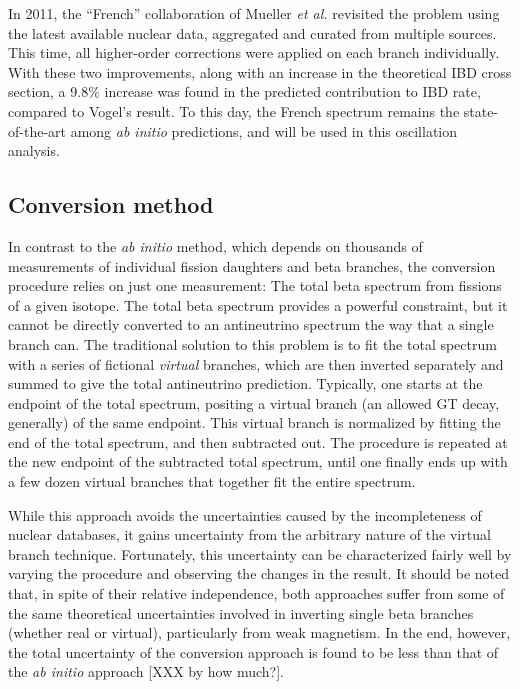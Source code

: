 \documentclass[../thesis.tex]{subfiles}
\begin{document}
In 2011, the ``French'' collaboration of Mueller \emph{et al.} revisited the problem using the latest available nuclear data, aggregated and curated from multiple sources. This time, all higher-order corrections were applied on each branch individually. With these two improvements, along with an increase in the theoretical IBD cross section, a 9.8\% increase was found in the predicted \ureight contribution to IBD rate, compared to Vogel's result. To this day, the French spectrum remains the state-of-the-art among \ureight \emph{ab initio} predictions, and will be used in this oscillation analysis.

\subsection{Conversion method}
\label{sec:conversion}

In contrast to the \emph{ab initio} method, which depends on thousands of measurements of individual fission daughters and beta branches, the conversion procedure relies on just one measurement: The total beta spectrum from fissions of a given isotope. The total beta spectrum provides a powerful constraint, but it cannot be directly converted to an antineutrino spectrum the way that a single branch can. The traditional solution to this problem is to fit the total spectrum with a series of fictional \emph{virtual} branches, which are then inverted separately and summed to give the total antineutrino prediction. Typically, one starts at the endpoint of the total spectrum, positing a virtual branch (an allowed GT decay, generally) of the same endpoint. This virtual branch is normalized by fitting the end of the total spectrum, and then subtracted out. The procedure is repeated at the new endpoint of the subtracted total spectrum, until one finally ends up with a few dozen virtual branches that together fit the entire spectrum.

While this approach avoids the uncertainties caused by the incompleteness of nuclear databases, it gains uncertainty from the arbitrary nature of the virtual branch technique. Fortunately, this uncertainty can be characterized fairly well by varying the procedure and observing the changes in the result. It should be noted that, in spite of their relative independence, both approaches suffer from some of the same theoretical uncertainties involved in inverting single beta branches (whether real or virtual), particularly from weak magnetism. In the end, however, the total uncertainty of the conversion approach is found to be less than that of the \emph{ab initio} approach [XXX by how much?].
\end{document}
